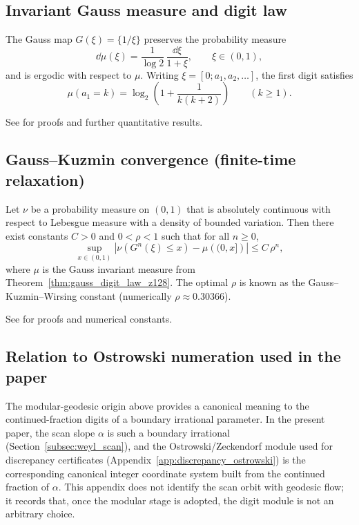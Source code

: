 \subsection{Invariant Gauss measure and digit law}
\label{subsec:gauss_measure_digit_law}

\begin{theorem}
\label{thm:gauss_digit_law_z128}
\MathTag The Gauss map $G(\xi)=\{1/\xi\}$ preserves the probability measure
\[
\dd\mu(\xi)=\frac{1}{\log 2}\,\frac{\dd \xi}{1+\xi},\qquad \xi\in(0,1),
\]
and is ergodic with respect to $\mu$.
Writing $\xi=[0;a_1,a_2,\ldots]$, the first digit satisfies
\[
\mu(a_1=k)=\log_2\!\left(1+\frac{1}{k(k+2)}\right)\qquad (k\ge 1).
\]
\end{theorem}
\begin{remark}
See \cite{IosifescuKraaikamp2002} for proofs and further quantitative results.
\end{remark}

\subsection{Gauss--Kuzmin convergence (finite-time relaxation)}
\label{subsec:gauss_kuzmin_z128}

\begin{theorem}
\label{thm:gauss_kuzmin_convergence_z128}
\MathTag Let $\nu$ be a probability measure on $(0,1)$ that is absolutely continuous with respect to Lebesgue measure with a density of bounded variation.
Then there exist constants $C>0$ and $0<\rho<1$ such that for all $n\ge 0$,
\[
\sup_{x\in(0,1)}\left|\nu\!\left(G^n(\xi)\le x\right)-\mu\!\left((0,x]\right)\right|
\le C\,\rho^n,
\]
where $\mu$ is the Gauss invariant measure from Theorem~\ref{thm:gauss_digit_law_z128}.
The optimal $\rho$ is known as the Gauss--Kuzmin--Wirsing constant (numerically $\rho\approx 0.30366$).
\end{theorem}
\begin{remark}
See \cite{IosifescuKraaikamp2002} for proofs and numerical constants.
\end{remark}

\subsection{Relation to Ostrowski numeration used in the paper}
\label{subsec:gauss_to_ostrowski_relation}

\AuditTag The modular-geodesic origin above provides a canonical meaning to the continued-fraction digits of a boundary irrational parameter.
In the present paper, the scan slope $\alpha$ is such a boundary irrational (Section~\ref{subsec:weyl_scan}), and the Ostrowski/Zeckendorf module used for discrepancy certificates (Appendix~\ref{app:discrepancy_ostrowski}) is the corresponding canonical integer coordinate system built from the continued fraction of $\alpha$.
This appendix does not identify the scan orbit with geodesic flow; it records that, once the modular stage is adopted, the digit module is not an arbitrary choice.


